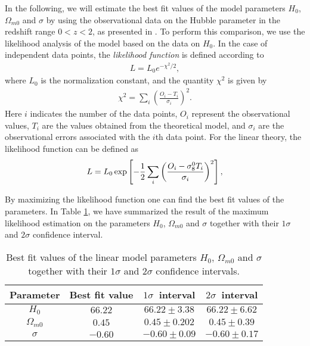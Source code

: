 \documentclass[aps,superscriptaddress, showpacs,preprintnumbers, superscriptaddress, nofootinbibt,twocolumn]{revtex4}
\begin{document}
In the following, we will estimate the best fit values of the model parameters $H_0$, $\Omega_{m0}$ and $\sigma$ by using the observational data on the Hubble parameter in the redshift range $0<z<2$, as presented in \cite{hubble}. To perform this comparison, we use the likelihood analysis of the model based on the data on $H_0$. In the case of independent data points, the {\it likelihood function} is defined according to
\begin{align}
L=L_0e^{-\chi^2/2},
\end{align}
where $L_0$ is the normalization constant, and the quantity $\chi^2$ is given by
\begin{align}
\chi^2=\sum_i\left(\frac{O_i-T_i}{\sigma_i}\right)^2.
\end{align}
Here $i$ indicates the number of the data points, $O_i$ represent the observational values, $T_i$ are the values obtained from the theoretical model, and $\sigma_i$ are the observational errors associated with the $i$th data point.
For the linear theory, the likelihood function can be defined as
\begin{align}
L=L_0\,\textmd{exp}\left[-\frac12\sum_i\left(\frac{O_i-\sigma_8^0T_i}{\sigma_i}\right)^2\right],
\end{align}

By maximizing the likelihood function one can find the best fit values of the parameters. In Table \ref{tab1}, we have summarized the result of the maximum likelihood estimation on the parameters $H_0$, $\Omega_{m0}$ and $\sigma$ together with their $1\sigma$ and $2\sigma$ confidence interval.
\begin{table}[h]
	\begin{center}
		\begin{tabular}{|c||c|c|c|}
			\hline
			Parameter&Best fit value&$1\sigma$~interval&$2\sigma$~interval\\
			\hline
			$H_0$&$66.22$&$66.22\pm3.38$&$66.22\pm6.62$\\
			\hline
			$\Omega_{m0}$&$0.45$&$0.45\pm0.202$&$0.45\pm0.39$\\
			\hline
			$\sigma$&$-0.60$&$-0.60\pm0.09$&$-0.60\pm0.17$\\
			\hline
		\end{tabular}
	\end{center}
	\caption{Best fit values of the linear model parameters $H_0$, $\Omega_{m0}$ and $\sigma$ together with their $1\sigma$ and $2\sigma$ confidence intervals.\label{tab1}}
\end{table}
\end{document}

